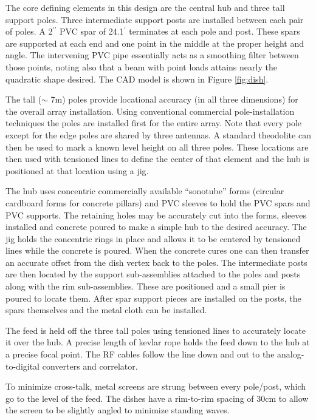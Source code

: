 \documentclass[preprint]{aastex}
\begin{document}
The core defining elements in this design are the central hub and three tall support poles.  Three intermediate 
support posts are installed between each pair of poles.  A 2$^{\prime\prime}$ PVC spar of 24.1$^{\prime}$ 
terminates at each pole and post.  These spars are supported at each end and one point in the middle at the 
proper height and angle.  The intervening PVC pipe essentially acts as a smoothing filter between those 
points, noting also that a beam with point loads attains nearly the quadratic shape desired.  The CAD model is 
shown in Figure \ref{fig:dish}.  

The tall ($\sim$ 7m) poles provide locational accuracy (in all three dimensions) for the overall array installation.  
Using conventional commercial pole-installation techniques the poles are installed first for the entire array.  
Note that every pole except for the edge poles are shared by three antennas.  A standard theodolite can 
then be used to mark a known level height on all three poles.  These locations are then used with tensioned 
lines to define the center of that element and the hub is positioned at that location using a jig.

The hub uses concentric commercially available ``sonotube'' forms (circular cardboard forms for concrete pillars) 
and PVC sleeves to hold the PVC spars and PVC supports.  The retaining holes may be accurately cut into 
the forms, sleeves installed and concrete poured to make a simple hub to the desired accuracy.  The jig holds 
the concentric rings in place and allows it to be centered by tensioned lines while the concrete is poured.  
When the concrete cures one can then transfer an accurate offset from the dish vertex back to the poles.
The intermediate posts are then located by the support sub-assemblies attached to the poles and posts along 
with the rim sub-assemblies.  These are positioned and a small pier is poured to locate them.  After spar support 
pieces are installed on the posts, the spars themselves and the metal cloth can be installed.

The feed is held off the three tall poles using tensioned lines to accurately locate it over the hub.  A precise 
length of kevlar rope holds the feed down to the hub at a precise focal point.  The RF cables follow the line 
down and out to the analog-to-digital converters and correlator.  

To minimize cross-talk, metal screens are strung between every pole/post, which go to the level of the feed.  
The dishes have a rim-to-rim spacing of 30cm to allow the screen to be slightly angled to minimize standing waves.
\end{document}
